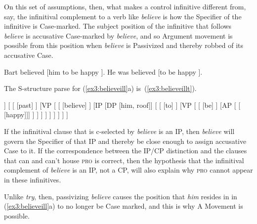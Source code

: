 On this set of assumptions, then, what makes a control infinitive different from, say, the infinitival complement to a verb like \emph{believe} is how the Specifier of the infinitive is Case-marked. The subject position of the infinitive that follows \emph{believe} is accusative Case-marked by \emph{believe}, and so Argument movement is possible from this position when \emph{believe} is Passivized and thereby robbed of its accusative Case.
\begin{exe}
\ex \label{ex3:believeill} 
\begin{xlist}
	\ex Bart believed [\IP him to be happy ].
	\ex He was believed [\IP to be happy ].
\end{xlist}
\end{exe}
The S-structure parse for (\ref{ex3:believeill}a) is~(\ref{ex3:believeillt}).
\begin{exe}
	\raggedright
	\ex \label{ex3:believeillt} 
	\small
	\begin{forest}
	[IP
		[DP [Bart, roof]]
		[ 
			[ [past] ]
			[VP [
				[ [believe] ]
				[IP
					[DP [him, roof]]
					[ 
						[ [to] ]
						[VP [
							[ [be] ]
							[AP [ [ [happy]]] ]
						] ]
					 ]
				 ]
			] ]
		]
	]
	\end{forest}
\end{exe}
If the infinitival clause that is c-selected by \emph{believe} is an IP, then \emph{believe} will govern the Specifier of that IP and thereby be close enough to assign accusative Case to it. If the correspondence between the IP/CP distinction and the clauses that can and can't house \textsc{pro} is correct, then the hypothesis that the infinitival complement of \emph{believe} is an IP, not a CP, will also explain why \textsc{pro} cannot appear in these infinitives.
\begin{exe}
	\raggedright
\end{exe}
Unlike \emph{try}, then, passivizing \emph{believe} causes the position that \emph{him} resides in in (\ref{ex3:believeill}a) to no longer be Case marked, and this is why A Movement is possible.

